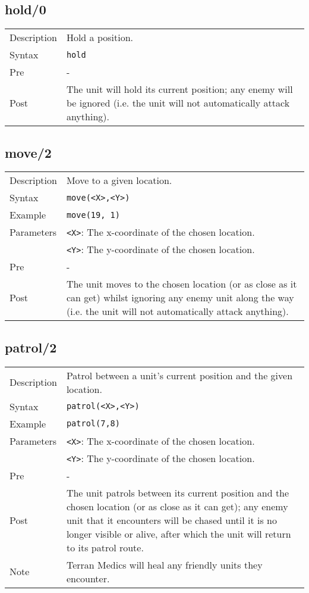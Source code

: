 \subsection{hold/0}
\begin{tabularx}{\textwidth}{lX}
 Description & Hold a position. \\
 Syntax & \verb|hold| \\
 Pre & - \\
 Post & The unit will hold its current position; any enemy will be ignored (i.e. the unit will not automatically attack anything). 
\end{tabularx}

\subsection{move/2}
\begin{tabularx}{\textwidth}{lX}
 Description & Move to a given location. \\
 Syntax & \verb|move(<X>,<Y>)| \\
 Example & \verb|move(19, 1)| \\
 Parameters & \verb|<X>|: The x-coordinate of the chosen location. \\
            &  \verb|<Y>|: The y-coordinate of the chosen location. \\
 Pre & - \\
 Post & The unit moves to the chosen location (or as close as it can get) whilst ignoring any enemy unit along the way (i.e. the unit will not automatically attack anything).
\end{tabularx}

\subsection{patrol/2}
\begin{tabularx}{\textwidth}{lX}
 Description & Patrol between a unit's current position and the given location. \\
 Syntax & \verb|patrol(<X>,<Y>)| \\
 Example & \verb|patrol(7,8)| \\
 Parameters & \verb|<X>|: The x-coordinate of the chosen location. \\
            &  \verb|<Y>|: The y-coordinate of the chosen location. \\
 Pre & - \\
 Post & The unit patrols between its current position and the chosen location (or as close as it can get); any enemy unit that it encounters will be chased until it is no longer visible or alive, after which the unit will return to its patrol route. \\
 Note & Terran Medics will heal any friendly units they encounter.
\end{tabularx}


